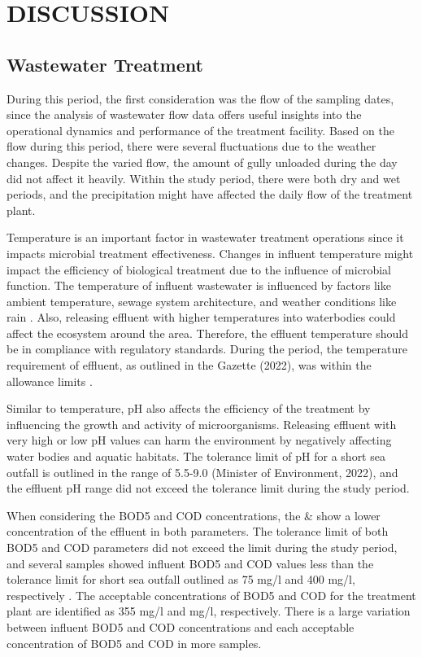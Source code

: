 \newpage
\section{DISCUSSION}

\subsection{Wastewater Treatment}
During this period, the first consideration was the flow of the sampling dates, since the analysis of wastewater flow data offers useful insights into the operational dynamics and performance of the treatment facility. Based on the flow during this period, there were several fluctuations due to the weather changes. Despite the varied flow, the amount of gully unloaded during the day did not affect it heavily. Within the study period, there were both dry and wet periods, and the precipitation might have affected the daily flow of the treatment plant.

Temperature is an important factor in wastewater treatment operations since it impacts microbial treatment effectiveness. Changes in influent temperature might impact the efficiency of biological treatment due to the influence of microbial function. The temperature of influent wastewater is influenced by factors like ambient temperature, sewage system architecture, and weather conditions like rain \cite{Brehar2019}. Also, releasing effluent with higher temperatures into waterbodies could affect the ecosystem around the area. Therefore, the effluent temperature should be in compliance with regulatory standards. During the period, the temperature requirement of effluent, as outlined in the Gazette (2022), was within the allowance limits \cite{CEA2022}.

Similar to temperature, pH also affects the efficiency of the treatment by influencing the growth and activity of microorganisms. Releasing effluent with very high or low pH values can harm the environment by negatively affecting water bodies and aquatic habitats. The tolerance limit of pH for a short sea outfall is outlined in the range of 5.5-9.0 (Minister of Environment, 2022), and the effluent pH range did not exceed the tolerance limit during the study period. 

When considering the \ac{BOD5} and \ac{COD} concentrations, the  \&  show a lower concentration of the effluent in both parameters. The tolerance limit of both \ac{BOD5} and \ac{COD} parameters did not exceed the limit during the study period, and several samples showed influent \ac{BOD5} and \ac{COD} values less than the tolerance limit for short sea outfall outlined as 75 mg/l and 400 mg/l, respectively \cite{CEA2022}. The acceptable concentrations of \ac{BOD5} and \ac{COD} for the treatment plant are identified as 355 mg/l and  mg/l, respectively. There is a large variation between influent \ac{BOD5} and \ac{COD} concentrations and each acceptable concentration of \ac{BOD5} and \ac{COD} in more samples. 

